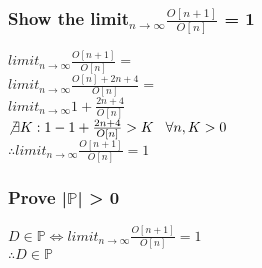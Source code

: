 \documentclass[11pt]{article}
\begin{document}
\subsubsection{Show the limit$_{n\rightarrow\infty} \frac{O[n+1]}{O[n]}$ = 1}
\begin{center}
$
limit_{n\rightarrow\infty} \frac
{O[n+1]}
{O[n]} =
$
\\ \vspace{4mm}
$
limit_{n\rightarrow\infty} \frac
{O[n] + 2n + 4}
{O[n]} =
$
\\ \vspace{4mm}
$
limit_{n\rightarrow\infty} 1 + \frac{2n+4}{O[n]}
$
\\ \vspace{4mm}
$
\not \exists K : 1 - 1 + \frac{2n + 4}{O[n]} > K \hspace{3mm} \forall n,K>0
$
\\ \vspace{4mm}
$
\therefore  limit_{n\rightarrow\infty} \frac{O[n+1]}{O[n]} = 1
$
\end{center}






\subsubsection{Prove |$\mathbb{P}$| > 0}
\begin{center}
$
D \in \mathbb{P} \Longleftrightarrow limit_{n\rightarrow\infty} \frac{O[n+1]}{O[n]} = 1
$
\\ \vspace{2mm}
$
\therefore D \in \mathbb{P}
$
\end{center}
\end{document}
